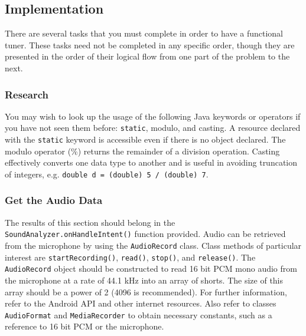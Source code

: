 \subsection{Implementation}
There are several tasks that you must complete in order to have a functional tuner. 
These tasks need not be completed in any specific order, though they are presented in the order of their logical flow from one part of the problem to the next.

\subsubsection{Research}
You may wish to look up the usage of the following Java keywords or operators if you have not seen them before: \verb=static=, modulo, and casting.
A resource declared with the \verb=static= keyword is accessible even if there is no object declared.
The modulo operator (\%) returns the remainder of a division operation.
Casting effectively converts one data type to another and is useful in avoiding truncation of integers, e.g. \verb+double d = (double) 5 / (double) 7+.

\subsubsection{Get the Audio Data}
The results of this section should belong in the \verb=SoundAnalyzer.onHandleIntent()= function provided.
Audio can be retrieved from the microphone by using the \verb=AudioRecord= class.
Class methods of particular interest are \verb=startRecording()=, \verb=read()=, \verb=stop()=, and \verb=release()=.
The \verb=AudioRecord= object should be constructed to read 16 bit PCM mono audio from the microphone at a rate of 44.1 kHz into an array of shorts.
The size of this array should be a power of 2 (4096 is recommended).
For further information, refer to the Android API and other internet resources.
Also refer to classes \verb=AudioFormat= and \verb=MediaRecorder= to obtain necessary constants, such as a reference to 16 bit PCM or the microphone.

